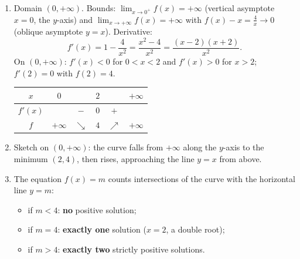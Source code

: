 \documentclass[11pt]{article}
\newcommand{\legende}[1]{\par\vspace{6pt}{\popsemi\fontsize{9}{11.5}\selectfont\color{popmuted}#1}}
\begin{document}
\begin{corrige}
\begin{enumerate}
\item Domain $(0,+\infty)$. Bounds: $\lim_{x\to 0^{+}}f(x)=+\infty$ (vertical asymptote $x=0$, the $y$-axis) and $\lim_{x\to+\infty}f(x)=+\infty$ with $f(x)-x=\tfrac{4}{x}\to 0$ (oblique asymptote $y=x$). Derivative:
\[ f'(x)=1-\frac{4}{x^{2}}=\frac{x^{2}-4}{x^{2}}=\frac{(x-2)(x+2)}{x^{2}}. \]
On $(0,+\infty)$: $f'(x)<0$ for $0<x<2$ and $f'(x)>0$ for $x>2$; $f'(2)=0$ with $f(2)=4$.
\begin{center}
\begin{tabular}{|c|ccccc|}
\hline
$x$ & $0$ & & $2$ & & $+\infty$ \\
\hline
$f'(x)$ & & $-$ & $0$ & $+$ & \\
\hline
$f$ & $+\infty$ & $\searrow$ & $4$ & $\nearrow$ & $+\infty$ \\
\hline
\end{tabular}
\end{center}
\item Sketch on $(0,+\infty)$: the curve falls from $+\infty$ along the $y$-axis to the minimum $(2,4)$, then rises, approaching the line $y=x$ from above.
\begin{popfigure}
\legende{Curve of $f(x)=x+\frac{4}{x}$ on $(0,+\infty)$.}
\end{popfigure}
\item The equation $f(x)=m$ counts intersections of the curve with the horizontal line $y=m$:
\begin{itemize}
\item if $m<4$: \textbf{no} positive solution;
\item if $m=4$: \textbf{exactly one} solution ($x=2$, a double root);
\item if $m>4$: \textbf{exactly two} strictly positive solutions.
\end{itemize}
\end{enumerate}
\end{corrige}
\end{document}
